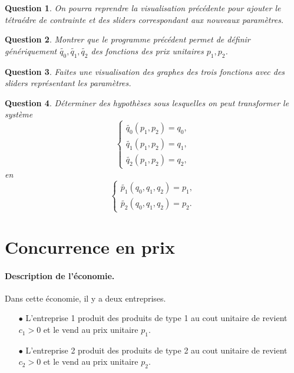 \documentclass[11pt]{article}
\newtheorem{question}{Question}
\begin{document}
\begin{question}
    On pourra reprendre la visualisation précédente pour ajouter le tétraédre de contrainte et des sliders correspondant aux nouveaux paramètres.
\end{question}

\begin{question}
    Montrer que le programme précédent permet de définir génériquement $\tilde{q_0},\tilde{q_1}, \tilde{q_2}$ des fonctions des prix unitaires $p_1, p_2$.
\end{question}

\begin{question}
    Faites une visualisation des graphes des trois fonctions avec des sliders représentant les paramètres.
\end{question}

\begin{question}
    Déterminer des hypothèses sous lesquelles on peut transformer le système 
    \begin{equation} \label{eq:3}
        \begin{cases}
            \tilde{q_0}(p_1, p_2) = q_0,\\
            \tilde{q_1}(p_1, p_2) = q_1,\\
            \tilde{q_2}(p_1, p_2) = q_2,
        \end{cases}
    \end{equation}
    en 
    \begin{equation}
        \begin{cases}
            \tilde{p_1}(q_0, q_1, q_2)=p_1,\\
            \tilde{p_2}(q_0, q_1, q_2)=p_2.
        \end{cases}
    \end{equation}
\end{question}
\section{Concurrence en prix}%
\label{sec:concurrence_en_prix}

\paragraph{Description de l'économie.} Dans cette économie, il y a deux entreprises.
\begin{itemize}
    \item[$\bullet$] L'entreprise 1 produit des produits de type 1 au cout unitaire de revient $c_1>0$ et le vend au prix unitaire $p_1$.
    \item[$\bullet$] L'entreprise 2 produit des produits de type 2 au cout unitaire de revient $c_2>0$ et le vend au prix unitaire $p_2$.
\end{itemize}
\end{document}
